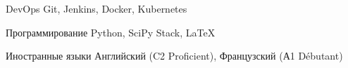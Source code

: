

\begin{cvskills}

  \cvskill
  {DevOps} %
  {Git, Jenkins, Docker, Kubernetes} %




  \cvskill
  {Программирование} %
  {Python, SciPy Stack, LaTeX} %

  \cvskill
  {Иностранные языки} %
  {Английский (C2 Proficient), Французский (А1 Débutant)} %

\end{cvskills}
